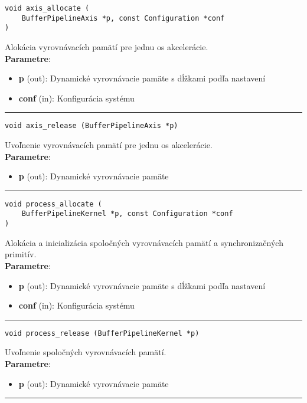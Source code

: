 \begin{lstlisting}[style=docs]
void axis_allocate (
	BufferPipelineAxis *p, const Configuration *conf
)
\end{lstlisting}
   Alokácia vyrovnávacích pamätí pre jednu os akcelerácie. \\ 
\textbf{Parametre}:
\begin{itemize}[noitemsep, topsep=0pt]
	\item \textbf{p} (out): Dynamické vyrovnávacie pamäte s dĺžkami podľa nastavení
	\item \textbf{conf} (in): Konfigurácia systému  
\end{itemize}
\bigbreak
\hrule

\begin{lstlisting}[style=docs]
void axis_release (BufferPipelineAxis *p)
\end{lstlisting}
   Uvoľnenie vyrovnávacích pamätí pre jednu os akcelerácie. \\ 
\textbf{Parametre}:
\begin{itemize}[noitemsep, topsep=0pt]
	\item \textbf{p} (out): Dynamické vyrovnávacie pamäte
\end{itemize}
\bigbreak
\hrule

\begin{lstlisting}[style=docs]
void process_allocate (
	BufferPipelineKernel *p, const Configuration *conf
)
\end{lstlisting}
   Alokácia a inicializácia spoločných vyrovnávacích pamätí a synchronizačných primitív. \\ 
\textbf{Parametre}:
\begin{itemize}[noitemsep, topsep=0pt]
	\item \textbf{p} (out): Dynamické vyrovnávacie pamäte s dĺžkami podľa nastavení
	\item \textbf{conf} (in): Konfigurácia systému  
\end{itemize}
\bigbreak
\hrule

\begin{lstlisting}[style=docs]
void process_release (BufferPipelineKernel *p)
\end{lstlisting}
   Uvoľnenie spoločných vyrovnávacích pamätí. \\ 
\textbf{Parametre}:
\begin{itemize}[noitemsep, topsep=0pt]
	\item \textbf{p} (out): Dynamické vyrovnávacie pamäte
\end{itemize}
\bigbreak
\hrule

